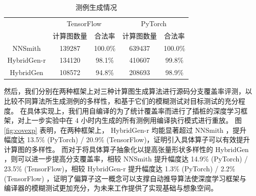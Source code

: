 \begin{table}[]
\centering
\caption{测例生成情况}
\label{tab:num_tests}
\begin{tabular}{ccccc}
  \toprule
  \multirow{2}{*}{} & \multicolumn{2}{c}{TensorFlow} & \multicolumn{2}{c}{PyTorch} \\ \cmidrule(lr){2-3} \cmidrule(lr){4-5} 
                    & 计算图数量        & 合法率             & 计算图数量      & 合法率            \\ \midrule
  NNSmith           & 139287       & 100.0\%      & 639437     & 100.0\%     \\
  HybridGen-r       & 134120       & 98.1\%      & 410607     & 99.8\%     \\
  HybridGen         & 108572       & 94.8\%      & 208693     & 98.9\%     \\ \bottomrule
\end{tabular}
\end{table}

然后，我们分别在两种框架上对三种计算图生成算法进行源码分支覆盖率评测，以比较不同算法所生成测例的多样性，和基于它们的模糊测试对目标测试的充分程度。
在具体实现上，我们用自编译的为了统计覆盖率而进行了插桩的深度学习框架，对上一步实验中在 4 小时内生成的所有测例用编译执行模式进行重放。
图 \ref{fig:covexp} 表明，在两种框架上， HybridGen-r 均能显著超过 NNSmith ，提升幅度达 13.5\% (PyTorch) / 20.9\% (TensorFlow)，证明引入具体算子可以有效提升计算图的多样性。
而对于将具体算子抽象化以提高张量形状多样性的 HybridGen ，则可以进一步提高分支覆盖率，相较 NNSmith 提升幅度达 14.9\% (PyTorch) / 23.5\% (TensorFlow)，相较 HybridGen-r 提升幅度达 1.3\% (PyTorch) / 2.2\% (TensorFlow) ，证明了偏算子这一概念可以支撑自动推导算法使深度学习框架与编译器的模糊测试更加充分，为未来工作提供了实现基础与想象空间。

